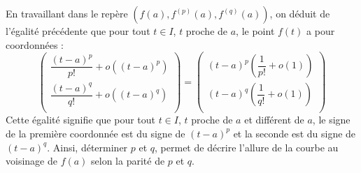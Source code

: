 \documentclass[french,11pt,twoside]{VcCours}
\begin{document}
En travaillant dans le repère $(f(a), f^{(p)}(a), f^{(q)}(a))$, on déduit de l'égalité précédente que pour tout $t \in I$, $t$ proche de $a$, le point $f(t)$ a pour coordonnées :
$$ \begin{pmatrix}
\dfrac{(t-a)^p}{p!}+o((t-a)^p) \\
\dfrac{(t-a)^q}{q!}+o((t-a)^q) \\
\end{pmatrix} = \begin{pmatrix}
(t-a)^p \left( \dfrac{1}{p!} + o(1) \right) \\
(t-a)^q \left( \dfrac{1}{q!} + o(1) \right) \\
\end{pmatrix}$$
Cette égalité signifie que pour tout $t \in I$, $t$ proche de $a$ et différent de $a$, le signe de la première coordonnée est du signe de $(t-a)^p$ et la seconde est du signe de $(t-a)^q$. Ainsi, déterminer $p$ et $q$, permet de décrire l'allure de la courbe au voisinage de $f(a)$ selon la parité de $p$ et $q$.
\end{document}

